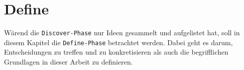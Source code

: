 \section{Define}
\label{sec:define}
  Wärend die \texttt{Discover-Phase} nur Ideen gesammelt und aufgelistet hat, soll in diesem Kapitel die \texttt{Define-Phase} betrachtet werden. Dabei geht es darum, Entscheidungen zu treffen und zu konkretisieren als auch die begrifflichen Grundlagen in dieser Arbeit zu definieren.
  
  
  
  
  
